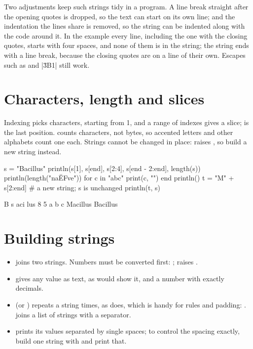 \documentclass[11pt,a4paper,openany]{report}
\begin{document}
{{Two adjustments keep such strings tidy in a program. A line break straight
after the opening quotes is dropped, so the text can start on its own line;
and the indentation the lines share is removed, so the string can be indented
along with the code around it. In the example every line, including the one
with the closing quotes, starts with four spaces, and none of them is in the
string; the string ends with a line break, because the closing quotes are on a
line of their own. Escapes such as \code{\n} and \code|\u{3B1}| still work.

\section{Characters, length and slices}

Indexing picks characters, starting from 1, and a range of indexes gives a
slice;  is the last position.  counts characters, not
bytes, so accented letters and other alphabets count one each. Strings cannot
be changed in place:  raises , so build a new
string instead.

\begin{axon}
s = "Bacillus"
println(s[1], s[end], s[2:4], s[end - 2:end], length(s))
println(length("na\u{EF}ve"))
for c in "abc"
  print(c, "")
end
println()
t = "M" + s[2:end]       # a new string; s is unchanged
println(t, s)
\end{axon}
\begin{axonout}
B s aci lus 8
5
a b c
Macillus Bacillus
\end{axonout}

\section{Building strings}

\begin{itemize}
\item \code{+} joins two strings. Numbers must be converted first:
  ;  raises .
\item {} gives any value as text, as  would show
  it, and  a number with exactly  decimals.
\item {} (or ) repeats a string  times, as
   does, which is handy for rules and padding:
  .  joins a list of strings with a
  separator.
\item {} prints its values separated by single spaces;
  to control the spacing exactly, build one string with \code{+} and print
  that.
\end{itemize}

}}
\end{document}
